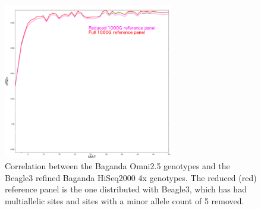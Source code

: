 \begin{figure}
\centering
\includegraphics[width=0.66\textwidth]{fig/imp_accu_beagle}
\caption{Correlation between the Baganda Omni2.5 genotypes and the Beagle3 refined Baganda HiSeq2000 4x genotypes. The reduced (red) reference panel is the one distributed with Beagle3, which has had multiallelic sites and sites with a minor allele count of 5 removed.}
\label{fig:imp_accu_beagle}
\end{figure}